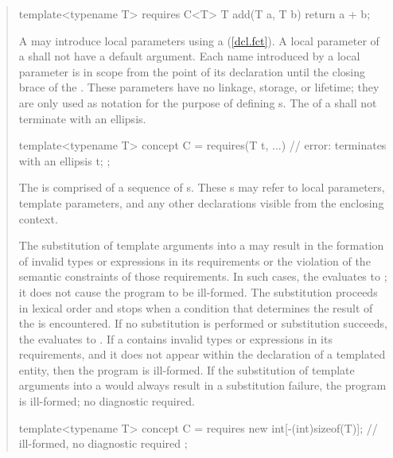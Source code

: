 \begin{quote}
\begin{addedblock}
\begin{codeblock}
template<typename T> requires C<T> 
  T add(T a, T b) { return a + b; }
\end{codeblock}
\exitnote

\pnum
A  may introduce local parameters using a
(\ref{dcl.fct}). 
%
A local parameter of a  shall not have a 
default argument.
%
Each name introduced by a local parameter is in scope from the point
of its declaration until the closing brace of the
.
%
These parameters have no linkage, storage, or lifetime; they are only used
as notation for the purpose of defining s.
%
The  of a 
 shall
not terminate with an ellipsis.
\enterexample
\begin{codeblock}
template<typename T>
  concept C = requires(T t, ...) { // error: terminates with an ellipsis
    t; 
  };
\end{codeblock}
\exitexample

\pnum
The  is comprised of 
a sequence of s.
%
These s may refer to local 
parameters, template parameters, and any other declarations visible from the 
enclosing context. 

\pnum
The substitution of template arguments into a  
may result in the formation of invalid types or expressions in its
requirements or the violation of the semantic constraints of those requirements.
In such cases, the  evaluates to ;
it does not cause the program to be ill-formed.
The substitution proceeds in lexical order and stops when a condition that
determines the result of the  is encountered.
If no substitution is performed or substitution succeeds,
the  evaluates to .
\enternote
If a  contains invalid types or expressions in
its requirements, and it does not appear within the declaration of a templated
entity, then the program is ill-formed.
\exitnote
If the substitution of template arguments into a  
would always result in a substitution failure, the program is ill-formed; 
no diagnostic required.
%
\enterexample
\begin{codeblock}
template<typename T> concept C =
  requires {
    new int[-(int)sizeof(T)]; // ill-formed, no diagnostic required
  };
\end{codeblock}
\exitexample



\end{addedblock}
\end{quote}

